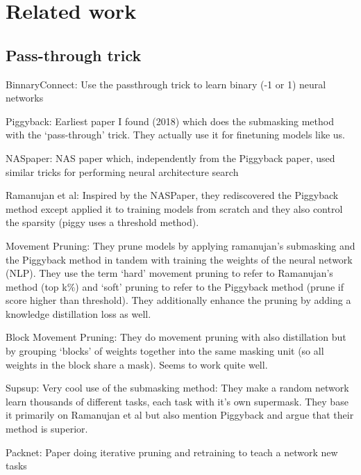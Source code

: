 \documentclass[12pt]{report}
\begin{document}
\chapter{Related work}


\section{Pass-through trick}
BinnaryConnect: Use the passthrough trick to learn binary (-1 or 1) neural networks~\cite{courbariauxBinaryConnectTrainingDeep2016, hubaraBinarizedNeuralNetworks}

Piggyback: Earliest paper I found (2018) which does the submasking method with the ‘pass-through’ trick. They actually use it for finetuning models like us.~\cite{mallyaPiggybackAdaptingSingle2018}

NASpaper: NAS paper which, independently from the Piggyback paper, used similar tricks for performing neural architecture
search~\cite{wortsmanDiscoveringNeuralWirings2019a}

Ramanujan et al: Inspired by the NASPaper, they rediscovered the Piggyback method except applied it to training models from scratch and they also control the sparsity (piggy uses a threshold method).~\cite{ramanujanWhatHiddenRandomly2020}

Movement Pruning: They prune models by applying ramanujan’s submasking and the Piggyback method in tandem with training the weights of the neural network (NLP). They use the term ‘hard’ movement pruning to refer to Ramanujan’s method (top k\%) and ‘soft’ pruning to refer to the Piggyback method (prune if score higher than threshold). They additionally enhance the pruning by adding a knowledge distillation loss as well.~\cite{sanhMovementPruningAdaptive}

Block Movement Pruning: They do movement pruning with also distillation but by grouping ‘blocks’ of weights together into the same masking unit (so all weights in the block share a mask). Seems to work quite well.~\cite{lagunasBlockPruningFaster2021}

Supsup: Very cool use of the submasking method: They make a random network learn thousands of different tasks, each task with it’s own supermask. They base it primarily on Ramanujan et al but also mention Piggyback and argue that their method is superior.~\cite{wortsmanSupermasksSuperposition}

Packnet: Paper doing iterative pruning and retraining to teach a network new tasks ~\cite{mallyaPackNetAddingMultiple2018}
\end{document}
